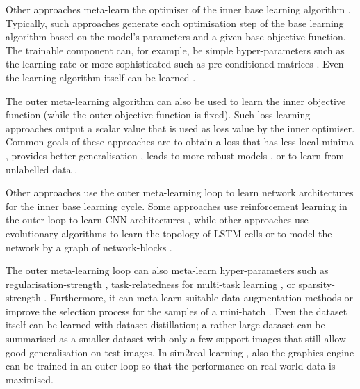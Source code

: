Other approaches meta-learn the optimiser of the inner base learning algorithm \cite{ravi2017optimization, Li_Malik_2016, Li_Zhou_Chen_Li_2017}.
Typically, such approaches generate each optimisation step of the base learning algorithm based on the model's parameters and a given base objective function.
The trainable component can, for example, be simple hyper-parameters such as the learning rate  or more sophisticated such as pre-conditioned matrices .
Even the learning algorithm itself can be learned .

The outer meta-learning algorithm can also be used to learn the inner objective function (while the outer objective function is fixed).
Such loss-learning approaches output a scalar value that is used as loss value by the inner optimiser.
Common goals of these approaches are to obtain a loss that has less local minima \cite{NEURIPS2018_7876acb6, Sung_Zhang_Xiang_Hospedales_Yang_2017}, provides better generalisation \cite{NEURIPS2018_b9a25e42, NEURIPS2019_e0e2b58d, gonzalez2020improved}, leads to more robust models \cite{li2019feature}, or to learn from unlabelled data \cite{NEURIPS2019_6018df18, Boney2018SemiSupervisedFL}.

Other approaches use the outer meta-learning loop to learn network architectures for the inner base learning cycle.
Some approaches use reinforcement learning in the outer loop to learn CNN architectures , while other approaches use evolutionary algorithms to learn the topology of LSTM cells  or to model the network by a graph of network-blocks .

The outer meta-learning loop can also meta-learn hyper-parameters such as regularisation-strength \cite{pmlr-v80-franceschi18a, Micaelli_Storkey_2021}, task-relatedness for multi-task learning , or sparsity-strength \cite{10-5555-3305381-3305502}. Furthermore, it can meta-learn suitable data augmentation methods \cite{Cubuk_2019_CVPR, Li_Hu_Wang_Hospedales_Robertson_Yang_2020} or improve the selection process for the samples of a mini-batch \cite{10-1609-aaai-v33i01-33015741, fan2018learning}.
Even the dataset itself can be learned with dataset distillation; a rather large dataset can be summarised as a smaller dataset with only a few support images \cite{Wang_Zhu_Torralba_Efros_2020, pmlr-v108-lorraine20a} that still allow good generalisation on test images. In sim2real learning , also the graphics engine \cite{ruiz2018learning, Vuong_Vikram_Su_Gao_Christensen_2019} can be trained in an outer loop so that the performance on real-world data is maximised.





